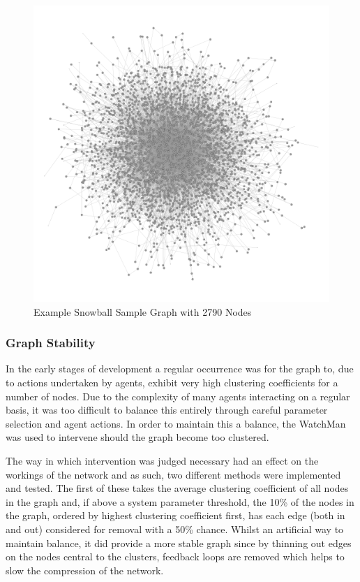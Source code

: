 \documentclass[]{report}
\begin{document}
\begin{figure}
\label{img:ex-snowball}
\begin{center}
\includegraphics[scale=0.25]{ex-snowball.png}
\end{center}
\caption{Example Snowball Sample Graph with 2790 Nodes}
\end{figure}

\subsubsection{Graph Stability}
In the early stages of development a regular occurrence was for the graph to, due to actions undertaken by agents, exhibit very high clustering coefficients for a number of nodes. Due to the complexity of many agents interacting on a regular basis, it was too difficult to balance this entirely through careful parameter selection and agent actions. In order to maintain this a balance, the WatchMan was used to intervene should the graph become too clustered.

The way in which intervention was judged necessary had an effect on the workings of the network and as such, two different methods were implemented and tested. The first of these takes the average clustering coefficient of all nodes in the graph and, if above a system parameter threshold, the 10\% of the nodes in the graph, ordered by highest clustering coefficient first, has each edge (both in and out) considered for removal with a 50\% chance. Whilst an artificial way to maintain balance, it did provide a more stable graph since by thinning out edges on the nodes central to the clusters, feedback loops are removed which helps to slow the compression of the network.
\end{document}
